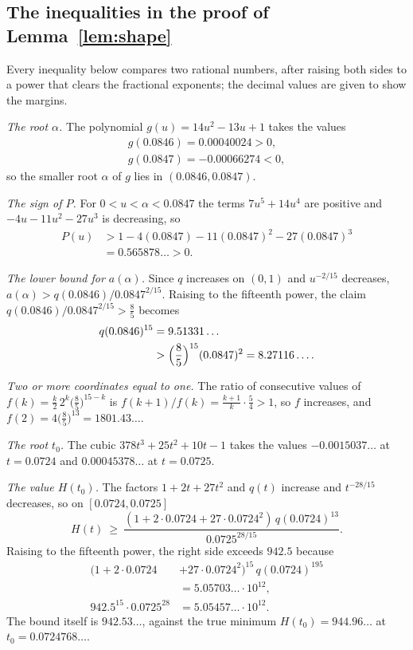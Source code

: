\documentclass[aps,prd,twocolumn,superscriptaddress,nofootinbib,longbibliography,floatfix,showkeys,amsmath,amssymb,10pt]{revtex4-2}
\theoremstyle{definition}
\theoremstyle{remark}
\begin{document}
\subsection{The inequalities in the proof of Lemma~\ref{lem:shape}}

Every inequality below compares two rational numbers, after raising both
sides to a power that clears the fractional exponents; the decimal values
are given to show the margins.

\emph{The root $\alpha$.} The polynomial $g(u)=14u^2-13u+1$ takes the
values
\begin{gather*}
 g(0.0846)=0.00040024>0,\\
 g(0.0847)=-0.00066274<0,
\end{gather*}
so the smaller root $\alpha$ of $g$ lies in $(0.0846,0.0847)$.

\emph{The sign of $P$.} For $0<u<\alpha<0.0847$ the terms $7u^5+14u^4$ are
positive and $-4u-11u^2-27u^3$ is decreasing, so
\begin{align*}
 P(u)&>1-4(0.0847)-11(0.0847)^2-27(0.0847)^3\\
 &=0.565878\ldots>0 .
\end{align*}

\emph{The lower bound for $a(\alpha)$.} Since $q$ increases on $(0,1)$ and
$u^{-2/15}$ decreases, $a(\alpha)>q(0.0846)/0.0847^{2/15}$. Raising to the
fifteenth power, the claim $q(0.0846)/0.0847^{2/15}>\frac85$ becomes
\begin{align*}
 q(0.0846)^{15}&=9.51331\ldots\\
 &>\Bigl(\frac85\Bigr)^{15}(0.0847)^2=8.27116\ldots .
\end{align*}

\emph{Two or more coordinates equal to one.} The ratio of consecutive
values of $f(k)=\frac k2\,2^k\bigl(\frac85\bigr)^{15-k}$ is
$f(k+1)/f(k)=\frac{k+1}k\cdot\frac54>1$, so $f$ increases, and
$f(2)=4\bigl(\frac85\bigr)^{13}=1801.43\ldots$.

\emph{The root $t_0$.} The cubic $378t^3+25t^2+10t-1$ takes the values
$-0.0015037\ldots$ at $t=0.0724$ and $0.00045378\ldots$ at $t=0.0725$.

\emph{The value $H(t_0)$.} The factors $1+2t+27t^2$ and $q(t)$ increase
and $t^{-28/15}$ decreases, so on $[0.0724,0.0725]$
\[
 H(t)\ \ge\ \frac{(1+2\cdot0.0724+27\cdot0.0724^2)\,q(0.0724)^{13}}
 {0.0725^{28/15}} .
\]
Raising to the fifteenth power, the right side exceeds $942.5$ because
\begin{align*}
 (1+2\cdot0.0724&+27\cdot0.0724^2)^{15}\,q(0.0724)^{195}\\
 &=5.05703\ldots\cdot10^{12},\\
 942.5^{15}\cdot0.0725^{28}&=5.05457\ldots\cdot10^{12}.
\end{align*}
The bound itself is $942.53\ldots$, against the true minimum
$H(t_0)=944.96\ldots$ at $t_0=0.0724768\ldots$.
\end{document}
